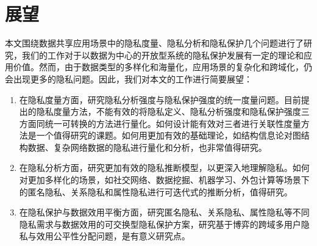 \section{展望}
   本文围绕数据共享应用场景中的隐私度量、隐私分析和隐私保护几个问题进行了研究，我们的工作对于以数据为中心的开放型系统的隐私保护发展有一定的理论和应用价值。然而，由于数据类型的多样化和海量化，应用场景的复杂化和跨域化，仍会出现更多的隐私问题。因此，我们对本文的工作进行简要展望：
\begin{enumerate}
	\item 在隐私度量方面，研究隐私分析强度与隐私保护强度的统一度量问题。目前提出的隐私度量方法，不能有效的将隐私定义、隐私分析强度和隐私保护强度三方面同统一可转换的方法进行量化。如何设计能有效对三者进行关联性度量方法是一个值得研究的课题。如何用更加有效的基础理论，如结构信息论对图结构数据、复杂网络数据的隐私进行量化和分析，也非常值得研究。
	
	\item 在隐私分析方面，研究更加有效的隐私推断模型，以更深入地理解隐私。如何对更加多样化的场景，如社交网络、数据挖掘、机器学习、外包计算等场景下的匿名隐私、关系隐私和属性隐私进行可迭代式的推断分析，值得研究。
	
	\item 在隐私保护与数据效用平衡方面，研究匿名隐私、关系隐私、属性隐私等不同隐私需求与数据效用的可交换型隐私保护方案，研究基于博弈的跨域多用户隐私与效用公平性分配问题，是有意义研究点。

\end{enumerate}
